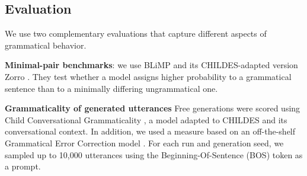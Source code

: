 


\subsection{Evaluation}
\label{sec:eval}

We use two complementary evaluations that capture different aspects of grammatical behavior. 

\noindent  \textbf{Minimal-pair benchmarks}: we use BLiMP \cite{warstadt2020blimp} and its CHILDES-adapted version Zorro \cite{huebner_babyberta_2021}. They test whether a model assigns higher probability to a grammatical sentence than to a minimally differing ungrammatical one.

\noindent \textbf{Grammaticality of generated utterances} Free generations were scored using Child Conversational Grammaticality  \cite[ChildCG, ][]{nikolaus_automatic_2024}, a model adapted to CHILDES and its conversational context. In addition, we used a measure based on an off-the-shelf Grammatical Error Correction model \cite[e.g.,][]{rothe_simple_2021}. For each run and generation seed, we sampled up to 10,000 utterances using the Beginning-Of-Sentence (BOS) token as a prompt.

